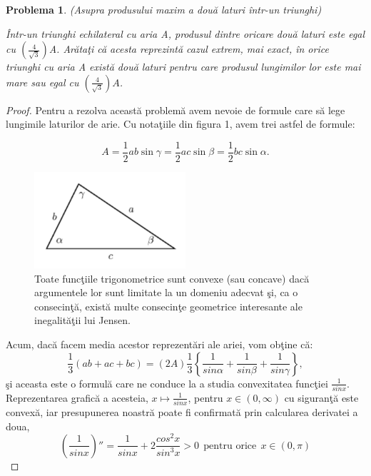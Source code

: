 \documentclass[a4paper,12pt,oneside]{report}
\newtheorem{problem}{Problema}
\begin{document}
\begin{problem}(Asupra produsului maxim a dou\u{a} laturi \^{i}ntr-un triunghi)

\^{I}ntr-un triunghi echilateral cu aria A, produsul dintre oricare dou\u{a} laturi este egal cu \(\left (\frac{4}{\sqrt{3}}  \right )\)A. Ar\u{a}ta\c{t}i c\u{a} acesta reprezint\u{a} cazul extrem, mai exact, \^{i}n orice triunghi cu aria A  exist\u{a} dou\u{a} laturi pentru care produsul lungimilor lor este mai mare sau egal cu \(\left (\frac{4}{\sqrt{3}}  \right )A\).
\end{problem}
\begin{proof}
  Pentru a rezolva aceast\u{a} problem\u{a} avem nevoie de formule care s\u{a} lege lungimile laturilor de arie. Cu nota\c{t}iile din figura 1, avem trei astfel de formule:

\begin{displaymath}
  A = \frac{1}{2}ab \sin\gamma = \frac{1}{2}ac \sin \beta = \frac{1}{2}bc \sin \alpha.
\end{displaymath}
\begin{figure}[htbp]
	\centering
	\includegraphics[width=0.5\textwidth]{fig2.1.png}
	\caption{ Toate func\c{t}iile trigonometrice sunt convexe (sau concave) dac\u{a}
argumentele lor sunt limitate la un domeniu adecvat \c{s}i, ca o consecin\c{t}\u{a},
exist\u{a} multe consecin\c{t}e geometrice interesante ale inegalit\u{a}\c{t}ii lui Jensen.}
\end{figure}




Acum, dac\u{a} facem media acestor reprezent\u{a}ri ale ariei, vom ob\c{t}ine c\u{a}:
\begin{displaymath}
  \frac{1}{3}\left ( ab + ac + bc \right )= \left ( 2A \right )\frac{1}{3}\left \{ \frac{1}{sin \alpha } + \frac{1}{sin \beta } + \frac{1}{sin \gamma }\right \}, \label{eq:2.1} \tag{2.1}
\end{displaymath}
\c{s}i aceasta este o formul\u{a} care ne conduce la a studia convexitatea func\c{t}iei \(\frac{1}{sin x}\). Reprezentarea grafic\u{a} a acesteia, \(x \mapsto \frac{1}{sin x}\), pentru \(x\in \left ( 0, \infty  \right )\) cu siguran\c{t}\u{a} este convex\u{a}, iar presupunerea noastr\u{a} poate fi confirmat\u{a} prin calcularea derivatei a doua,
\begin{displaymath}
  {\left ( \frac{1}{sin x} \right )}''= \frac{1}{sin x} + 2\frac{cos^{2}x}{sin ^{3}x}> 0~~ \text{pentru orice}~~ x\in \left ( 0, \pi  \right )  \label{eq:2.2} \tag{2.2}
\end{displaymath}


\end{proof}
\end{document}
